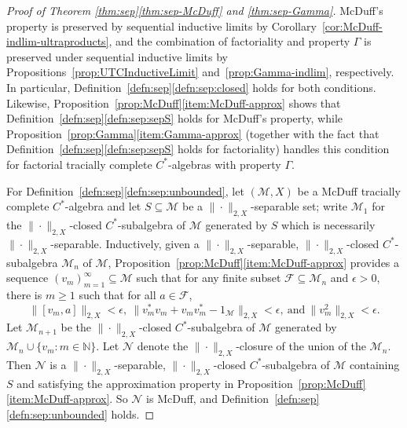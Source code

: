 \documentclass[a4paper,11pt]{amsart}
\theoremstyle{definition}
\numberwithin{equation}{section}
\numberwithin{theorem}{section}
\newcommand{\M}{\mathcal{M}}
\begin{document}
\begin{proof}[Proof of Theorem \ref{thm:sep}\ref{thm:sep-McDuff} and \ref{thm:sep-Gamma}]
	McDuff's property is preserved by sequential inductive limits by Corollary~\ref{cor:McDuff-indlim-ultraproducts}, and the combination of factoriality and property $\Gamma$ is preserved under sequential inductive limits by Propositions~\ref{prop:UTCInductiveLimit} and~\ref{prop:Gamma-indlim}, respectively. In particular, Definition~\ref{defn:sep}\ref{defn:sep:closed} holds for both conditions.  Likewise, Proposition~\ref{prop:McDuff}\ref{item:McDuff-approx} shows that Definition~\ref{defn:sep}\ref{defn:sep:sepS} holds for McDuff's property, while   Proposition~\ref{prop:Gamma}\ref{item:Gamma-approx} (together with the fact that Definition~\ref{defn:sep}\ref{defn:sep:sepS} holds for factoriality) handles this condition for factorial tracially complete $C^*$-algebras with property $\Gamma$.
 
 
For Definition~\ref{defn:sep}\ref{defn:sep:unbounded}, let $(\mathcal M, X)$ be a McDuff tracially complete $C^*$-algebra and let $S \subseteq \M$ be a $\|\cdot\|_{2, X}$-separable set; write $\mathcal M_1$ for the $\|\cdot\|_{2, X}$-closed $C^*$-subalgebra of $\M$ generated by $S$ which is necessarily $\|\cdot\|_{2,X}$-separable. Inductively, given a $\|\cdot\|_{2,X}$-separable, $\|\cdot\|_{2,X}$-closed $C^*$-subalgebra $\mathcal M_n$ of $\mathcal M$,   Proposition~\ref{prop:McDuff}\ref{item:McDuff-approx} provides a sequence $(v_m)_{m=1}^\infty \subseteq \M$ such that for any finite subset $\mathcal F \subseteq \mathcal M_n$ and $\epsilon>0$, there is $m \geq 1$ such that for all $a \in \mathcal F$,
	\begin{equation}
		\|[v_m, a]\|_{2, X} < \epsilon,\ \|v_m^*v_m + v_mv_m^* - 1_\mathcal M\|_{2, X} <\epsilon,\ 
		\text{and}\
		\|v_m^2\|_{2, X} < \epsilon.
	\end{equation}
	Let $\M_{n+1}$ be the $\|\cdot\|_{2, X}$-closed $C^*$-subalgebra of $\M$ generated by $\M_n\cup\{v_m:m\in\mathbb N\}$. Let $\mathcal N$ denote the $\|\cdot\|_{2, X}$-closure of the union of the $\M_n$.  Then $\mathcal N$ is a $\|\cdot\|_{2, X}$-separable, $\|\cdot\|_{2, X}$-closed $C^*$-subalgebra of $\M$ containing $S$ and satisfying the approximation property in Proposition~\ref{prop:McDuff}\ref{item:McDuff-approx}.  So $\mathcal N$ is McDuff, and Definition~\ref{defn:sep}\ref{defn:sep:unbounded} holds.


\end{proof}
\end{document}
